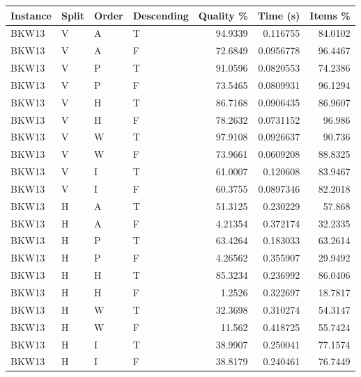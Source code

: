 \begin{tabular}{llllrrr}
    \hline
    Instance & Split & Order & Descending & Quality \% & Time (s)  & Items \% \\
    \hline
    BKW13    & V     & A     & T          & 94.9339    & 0.116755  & 84.0102  \\
    BKW13    & V     & A     & F          & 72.6849    & 0.0956778 & 96.4467  \\
    BKW13    & V     & P     & T          & 91.0596    & 0.0820553 & 74.2386  \\
    BKW13    & V     & P     & F          & 73.5465    & 0.0809931 & 96.1294  \\
    BKW13    & V     & H     & T          & 86.7168    & 0.0906435 & 86.9607  \\
    BKW13    & V     & H     & F          & 78.2632    & 0.0731152 & 96.986   \\
    BKW13    & V     & W     & T          & 97.9108    & 0.0926637 & 90.736   \\
    BKW13    & V     & W     & F          & 73.9661    & 0.0609208 & 88.8325  \\
    BKW13    & V     & I     & T          & 61.0007    & 0.120608  & 83.9467  \\
    BKW13    & V     & I     & F          & 60.3755    & 0.0897346 & 82.2018  \\
    BKW13    & H     & A     & T          & 51.3125    & 0.230229  & 57.868   \\
    BKW13    & H     & A     & F          & 4.21354    & 0.372174  & 32.2335  \\
    BKW13    & H     & P     & T          & 63.4264    & 0.183033  & 63.2614  \\
    BKW13    & H     & P     & F          & 4.26562    & 0.355907  & 29.9492  \\
    BKW13    & H     & H     & T          & 85.3234    & 0.236992  & 86.0406  \\
    BKW13    & H     & H     & F          & 1.2526     & 0.322697  & 18.7817  \\
    BKW13    & H     & W     & T          & 32.3698    & 0.310274  & 54.3147  \\
    BKW13    & H     & W     & F          & 11.562     & 0.418725  & 55.7424  \\
    BKW13    & H     & I     & T          & 38.9907    & 0.250041  & 77.1574  \\
    BKW13    & H     & I     & F          & 38.8179    & 0.240461  & 76.7449  \\

\end{tabular}
